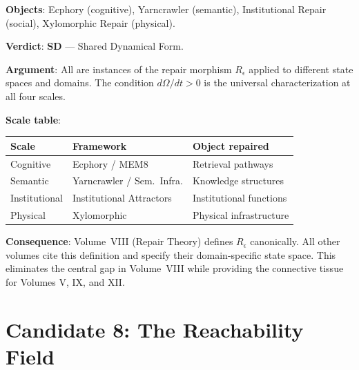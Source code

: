 \documentclass[11pt, a4paper]{book}
\theoremstyle{flyxion}
\theoremstyle{remark}
\begin{document}
\begin{flybox}
\textbf{Objects}: Ecphory (cognitive), Yarncrawler (semantic),
Institutional Repair (social), Xylomorphic Repair (physical).

\textbf{Verdict}: \textbf{SD} --- Shared Dynamical Form.

\textbf{Argument}: All are instances of the repair morphism
$R_\epsilon$ applied to different state spaces and domains. The
condition $d\Omega/dt > 0$ is the universal characterization at
all four scales.

\textbf{Scale table}:
\begin{center}
\begin{tabular}{lll}
Scale & Framework & Object repaired \\
\hline
Cognitive & Ecphory / MEM\textbar{}8 & Retrieval pathways \\
Semantic & Yarncrawler / Sem.\ Infra. & Knowledge structures \\
Institutional & Institutional Attractors & Institutional functions \\
Physical & Xylomorphic & Physical infrastructure \\
\end{tabular}
\end{center}

\textbf{Consequence}: Volume~VIII (Repair Theory) defines $R_\epsilon$
canonically. All other volumes cite this definition and specify their
domain-specific state space. This eliminates the central gap in
Volume~VIII while providing the connective tissue for Volumes V,
IX, and XII.
\end{flybox}

\section{Candidate 8: The Reachability Field}
\end{document}
